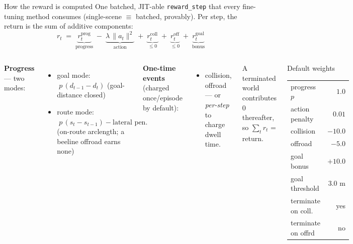 \begin{frame}{How the reward is computed}
  \small
  One batched, JIT-able \texttt{reward\_step} that every fine-tuning method
  consumes (single-scene $\equiv$ batched, provably). Per step, the return is the
  sum of additive components:
  \[
    r_t \;=\; \underbrace{r^{\text{prog}}_t}_{\text{progress}}
    \;-\; \underbrace{\lambda\,\|a_t\|^2}_{\text{action}}
    \;+\; \underbrace{r^{\text{coll}}_t}_{\le 0}
    \;+\; \underbrace{r^{\text{off}}_t}_{\le 0}
    \;+\; \underbrace{r^{\text{goal}}_t}_{\text{bonus}}
  \]
  \begin{columns}[T]
    \textbf{Progress} --- two modes:
    \begin{itemize}\itemsep1pt
      \item goal mode: $\;p\,(d_{t-1}-d_t)$ \; (goal-distance closed)
      \item route mode: $\;p\,(s_t-s_{t-1}) - \text{lateral pen.}$\\
            (on-route arclength; a beeline offroad earns none)
    \end{itemize}
    \textbf{One-time events} (charged once/episode by default):
    \begin{itemize}\itemsep1pt
      \item collision, offroad --- or \emph{per-step} to charge dwell time.
    \end{itemize}
    A terminated world contributes 0 thereafter, so $\sum_t r_t$ = return.

    \begin{block}{Default weights}
    \begin{tabular}{@{}lr@{}}
      progress $p$      & $1.0$ \\
      action penalty    & $0.01$ \\
      collision         & $-10.0$ \\
      offroad           & $-5.0$ \\
      goal bonus        & $+10.0$ \\
      goal threshold    & $3.0$ m \\
      \midrule
      terminate on coll.& yes \\
      terminate on offrd& no \\
    \end{tabular}
    \end{block}
  \end{columns}
\end{frame}

